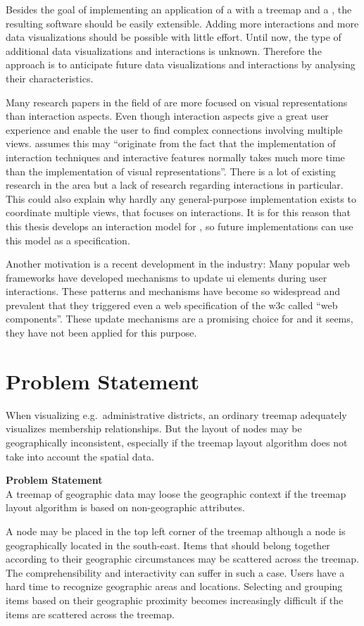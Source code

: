Besides the goal of implementing an application of a \cmv{} with a treemap and a \gv{}, the resulting software should be easily extensible.
Adding more interactions and more data visualizations should be possible with little effort.
Until now, the type of additional data visualizations and interactions is unknown.
Therefore the approach is to anticipate future data visualizations and interactions by analysing their characteristics.

Many research papers in the field of \cmvs{} are more focused on visual representations than interaction aspects.
Even though interaction aspects give a great user experience and enable the user to find complex connections involving multiple views.
\textcite{Ho2013} assumes this may ``originate from the fact that the implementation of interaction techniques and interactive features normally takes much more time than the implementation of visual representations''.
There is a lot of existing research in the area but a lack of research regarding interactions in particular.
This could also explain why hardly any general-purpose implementation exists to coordinate multiple views, that focuses on interactions.
It is for this reason that this thesis develops an interaction model for \cmvs{}, so future implementations can use this model as a specification.

Another motivation is a recent development in the industry:
Many popular web frameworks have developed mechanisms to update \gls{ui} elements during user interactions.
These patterns and mechanisms have become so widespread and prevalent that they triggered even a web specification of the \gls{w3c} called ``web components''.
These update mechanisms are a promising choice for \cmvs{} and it seems, they have not been applied for this purpose.

\section{Problem Statement}
When visualizing e.g.\ administrative districts, an ordinary treemap adequately visualizes membership relationships.
But the layout of nodes may be geographically inconsistent, especially if the treemap layout algorithm does not take into account the spatial data.
\begin{tcolorbox}
\textbf{Problem Statement} \\
A treemap of geographic data may loose the geographic context if the treemap layout algorithm is based on non-geographic attributes.
\end{tcolorbox}
A node may be placed in the top left corner of the treemap although a node is geographically located in the south-east.
Items that should belong together according to their geographic circumstances may be scattered across the treemap.
The comprehensibility and interactivity can suffer in such a case.
Users have a hard time to recognize geographic areas and locations.
Selecting and grouping items based on their geographic proximity becomes increasingly difficult if the items are scattered across the treemap.

